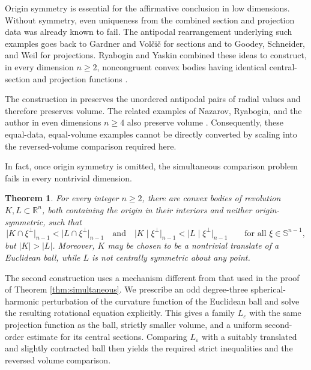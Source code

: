 \documentclass[11pt]{article}
\newtheorem{theorem}{Theorem}[section]
\theoremstyle{remark}
\newcommand{\R}{\mathbb{R}}
\newcommand{\Sph}{\mathbb{S}}
\begin{document}
Origin symmetry is essential for the affirmative conclusion in low
dimensions.  Without symmetry, even uniqueness from the combined section
and projection data was already known to fail.  The antipodal rearrangement
underlying such examples goes back to Gardner and Vol\v{c}i\v{c}
\cite{GardnerVolcic} for sections and to Goodey, Schneider, and Weil
\cite{GoodeySchneiderWeil} for projections.  Ryabogin and Yaskin combined
these ideas to construct, in every dimension $n\geq2$, noncongruent convex
bodies having identical central-section and projection functions
\cite[Lemma~2.1, Proposition~2.2, and
Corollary~2.3]{RyaboginYaskin}.

The construction in \cite{RyaboginYaskin} preserves the unordered
antipodal pairs of radial values and therefore preserves volume.  The
related examples of Nazarov, Ryabogin, and the author in even dimensions
$n\geq4$ also preserve volume
\cite[Theorem~2]{NazarovRyaboginZvavitchNonuniqueness}.  Consequently,
these equal-data, equal-volume examples cannot be directly converted by scaling into
the reversed-volume comparison required here.

In fact, once origin symmetry is omitted, the simultaneous comparison
problem fails in every nontrivial dimension.

\begin{theorem}\label{thm:nonsymmetric}
For every integer $n\geq2$, there are convex bodies of revolution
$K,L\subset\R^n$, both containing the origin in their interiors and neither
origin-symmetric, such that
\[
 \bigl|K\cap\xi^\perp\bigr|_{n-1}
 <\bigl|L\cap\xi^\perp\bigr|_{n-1}
 \quad\text{and}\quad
 \bigl|K\mid\xi^\perp\bigr|_{n-1}
 <\bigl|L\mid\xi^\perp\bigr|_{n-1}
 \qquad\text{for all }\xi\in\Sph^{n-1},
\]
but $|K|>|L|$.  Moreover, $K$ may be chosen to be a nontrivial translate
of a Euclidean ball, while $L$ is not centrally symmetric about any point.
\end{theorem}

The second construction uses a mechanism different from that used in the proof of  Theorem \ref{thm:simultaneous}.  We prescribe an odd
degree-three spherical-harmonic perturbation of the curvature function of
the Euclidean ball and solve the resulting rotational equation explicitly.
This gives a family $L_\varepsilon$ with the same projection function as the
ball, strictly smaller volume, and a uniform second-order estimate for its
central sections.  Comparing $L_\varepsilon$ with a suitably translated and
slightly contracted ball then yields the required strict inequalities and
the reversed volume comparison.
\end{document}

